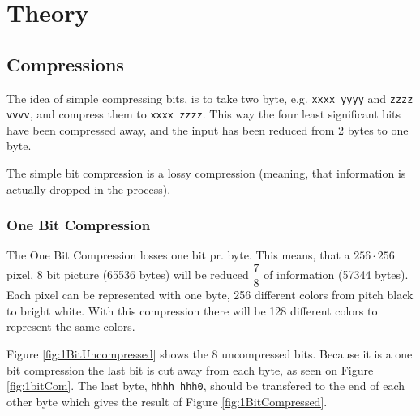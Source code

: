 \section{Theory}

\subsection{Compressions}

The idea of simple compressing bits, is to take two byte, e.g. \texttt{xxxx yyyy} and \texttt{zzzz vvvv}, and compress them to \texttt{xxxx zzzz}.
This way the four least significant bits have been compressed away, and the input has been reduced from 2 bytes to one byte.

The simple bit compression is a lossy compression (meaning, that information is actually dropped in the process).


\subsubsection{One Bit Compression} %
\label{sub:one_bit_compression}
\FloatBarrier

The One Bit Compression losses one bit pr. byte.
This means, that a $256 \cdot 256$ pixel, 8 bit picture (65536 bytes) will be reduced $\dfrac{7}{8}$ of information (57344 bytes).
Each pixel can be represented with one byte, 256 different colors from pitch black to bright white.
With this compression there will be 128 different colors to represent the same colors.

Figure \ref{fig:1BitUncompressed} shows the 8 uncompressed bits. 
Because it is a one bit compression the last bit is cut away from each byte, as seen on Figure \ref{fig:1bitCom}.
The last byte, \texttt{hhhh hhh0}, should be transfered to the end of each other byte which gives the result of Figure \ref{fig:1BitCompressed}.


